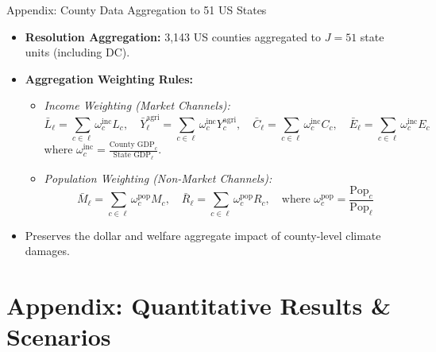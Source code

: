 \documentclass[aspectratio=169, 10pt]{beamer}
\begin{document}
\begin{frame}{Appendix: County Data Aggregation to 51 US States \hfill \hyperlink{main:damage_mapping}{\scriptsize{}}}\label{backup:county_aggregation}
    \begin{itemize}\small\setlength{\itemsep}{3pt}
        \item \textbf{Resolution Aggregation:} 3,143 US counties aggregated to $J = 51$ state units (including DC).
        \item \textbf{Aggregation Weighting Rules:}
        \begin{itemize}\footnotesize\setlength{\itemsep}{2pt}
            \item \textit{Income Weighting (Market Channels):}
            $$\bar{L}_\ell = \sum_{c \in \ell} \omega_c^{\text{inc}} L_c, \quad \bar{Y}_\ell^{\text{agri}} = \sum_{c \in \ell} \omega_c^{\text{inc}} Y_c^{\text{agri}}, \quad \bar{C}_\ell = \sum_{c \in \ell} \omega_c^{\text{inc}} C_c, \quad \bar{E}_\ell = \sum_{c \in \ell} \omega_c^{\text{inc}} E_c$$
            where $\omega_c^{\text{inc}} = \frac{\text{County GDP}_c}{\text{State GDP}_\ell}$.
            \item \textit{Population Weighting (Non-Market Channels):}
            $$\bar{M}_\ell = \sum_{c \in \ell} \omega_c^{\text{pop}} M_c, \quad \bar{R}_\ell = \sum_{c \in \ell} \omega_c^{\text{pop}} R_c, \quad \text{where } \omega_c^{\text{pop}} = \frac{\text{Pop}_c}{\text{Pop}_\ell}$$
        \end{itemize}
        \item Preserves the dollar and welfare aggregate impact of county-level climate damages.
    \end{itemize}
\end{frame}

\section{Appendix: Quantitative Results \& Scenarios}
\end{document}
